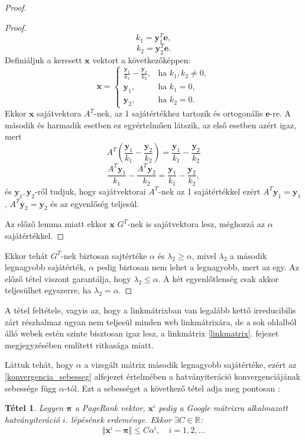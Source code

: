 \documentclass[12pt,a4paper]{article}
\newcommand{\bx}{\mathbf{x}}
\newcommand{\be}{\mathbf{e}}
\newcommand{\by}{\mathbf{y}}
\newtheorem{tetel}{Tétel}
\begin{document}
\begin{proof}
\begin{proof}
		\[ k_1 = \by_1^T \be, \]
		\[ k_2 = \by_2^T \be. \]
		Definiáljuk a keresett $\bx$ vektort a következőképpen:
		\begin{equation*}
		\bx=\begin{cases}
		\frac{\by_1}{k_1} - \frac{\by_2}{k_2}, & \text{ha $k_1,k_2 \neq 0$},\\
		\by_1, & \text{ha $k_1 = 0$}, \\
		\by_2, & \text{ha $k_2 = 0$}. 
		\end{cases}
		\end{equation*}
		\noindent
		Ekkor $\bx$ sajátvektora $A^T$-nek, az 1 sajátértékhez tartozik és ortogonális $\be$-re. A második és harmadik esetben ez egyértelműen látszik, az első esetben azért igaz, mert 
		\[ A^T (\frac{\by_1}{k_1} - \frac{\by_2}{k_2}) = \frac{\by_1}{k_1} - \frac{\by_2}{k_2} \] 
		\[ \frac{A^T \by_1}{k_1} - \frac{A^T \by_2}{k_2} = \frac{\by_1}{k_1} - \frac{\by_2}{k_2}, \]
		és $\by_1,\by_2$-ről tudjuk, hogy sajátvektorai $A^T$-nek az 1 sajátértékkel ezért $A^T \by_1 = \by_1$, $A^T \by_2 = \by_2$ és az egyenlőség teljesül. 
		
		Az előző lemma miatt ekkor $\bx$ $G^T$-nek is sajátvektora lesz, méghozzá az $\alpha$ sajátértékkel.  
	\end{proof} 

	Ekkor tehát $G^T$-nek biztosan sajtértéke $\alpha$ és $\lambda_2 \geq \alpha$, mivel $\lambda_2$ a második legnagyobb sajátérték, $\alpha$ pedig biztosan nem lehet a legnagyobb, mert az egy. Az előző tétel viszont garantálja, hogy $\lambda_2 \leq \alpha$. A két egyenlőtlenség csak akkor teljesülhet egyszerre, ha $\lambda_2 = \alpha$.
\end{proof}
\vspace{0.2cm}

A tétel feltétele, vagyis az, hogy a linkmátrixban van legalább kettő irreducibilis zárt részhalmaz ugyan nem teljesül minden web linkmátrixára, de a sok oldalból álló webek estén szinte bisztosan igaz lesz, a linkmátrix \ref{linkmatrix}. fejezet megjegyzésében említett ritkasága miatt.

Láttuk tehát, hogy $\alpha$ a vizsgált mátrix második legnagyobb sajátértéke, ezért az \ref{konvergencia_sebesseg} alfejezet értelmében a hatványiteráció konvergenciájának sebessége függ $\alpha$-tól. Ezt a sebességet a következő tétel adja meg pontosan \cite{convergence_speed}:

\begin{tetel}
	Legyen $\bm{\pi}$ a PageRank vektor, $\bx^i$ pedig a Google mátrixra alkalmazott hatványiteráció $i$. lépésének erdeménye. Ekkor $\exists C \in \mathbb{R}$:
	\[ \Vert \bx^i - \bm{\pi} \Vert \leq C \alpha^i, \quad i = 1,2,\ldots \]
\end{tetel}
\end{document}
